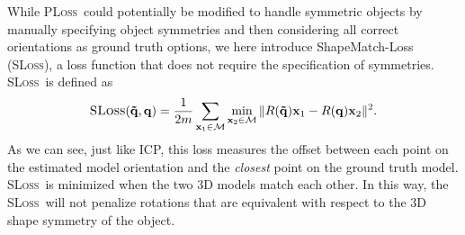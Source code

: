 \documentclass[conference]{IEEEtran}
\newcommand{\sloss}{\textsc{SLoss}}
\newcommand{\pl}{\textsc{PLoss}}
\begin{document}
While \pl\ could potentially be modified to handle symmetric objects by manually specifying object symmetries and then considering all correct orientations as ground truth options, we here introduce ShapeMatch-Loss (\sloss), a loss function that does not require the specification of symmetries. \sloss\ is defined as
\begin{equation}
\text{\sloss}(\mathbf{\tilde{q}}, \mathbf{q}) = \frac{1}{2m}\sum_{\mathbf{x}_1 \in \mathcal{M}} \min_{\mathbf{x}_2 \in \mathcal{M}} \| R(\mathbf{\tilde{q}}) \mathbf{x}_1 - R(\mathbf{q}) \mathbf{x}_2  \|^2.
\end{equation}
As we can see, just like ICP, this loss measures the offset between each point on the estimated model orientation and the \emph{closest} point on the ground truth model. \sloss\ is minimized when the two 3D models match each other. In this way, the \sloss\ will not penalize rotations that are equivalent with respect to the 3D shape symmetry of the object.




\end{document}
